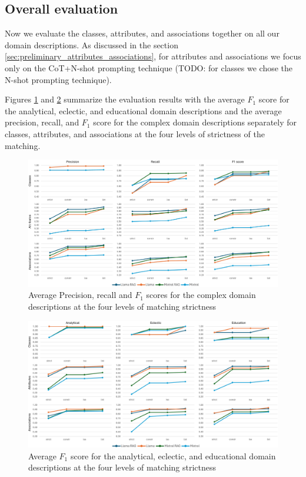 

\subsection{Overall evaluation}
\label{sec:overall_evaluation}

Now we evaluate the classes, attributes, and associations together on all our domain descriptions. As discussed in the section \ref{sec:preliminary_attributes_associations}, for attributes and associations we focus only on the CoT+N-shot prompting technique (TODO: for classes we chose the N-shot prompting technique).

Figures \ref{fig:evaluation-complex-p-r-f1} and \ref{fig:evaluation-simple-f1} summarize the evaluation results with the average $F_1$ score for the analytical, eclectic, and educational domain descriptions and the average precision, recall, and $F_1$ score for the complex domain descriptions separately for classes, attributes, and associations at the four levels of strictness of the matching.

\begin{figure}[!h]
    \centering
    \includegraphics[scale=0.10]{img/evaluation-complex-p-r-f1.png}
    \caption{\centering Average Precision, recall and $F_1$ scores for the complex domain descriptions at the four levels of matching strictness}
    \label{fig:evaluation-complex-p-r-f1}
\end{figure}

\begin{figure}[!h]
    \centering
    \includegraphics[scale=0.10]{img/evaluation-simple-f1.png}
    \caption{\centering Average $F_1$ score for the analytical, eclectic, and educational domain descriptions at the four levels of matching strictness}
    \label{fig:evaluation-simple-f1}
\end{figure}


